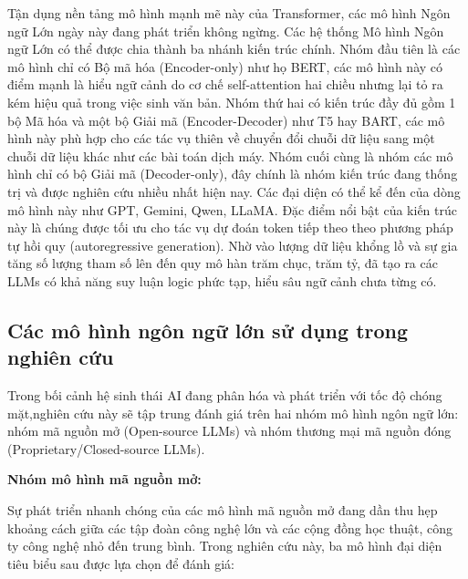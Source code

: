 Tận dụng nền tảng mô hình mạnh mẽ này của Transformer, các mô hình Ngôn ngữ Lớn ngày này đang phát triển không ngừng. Các hệ thống Mô hình Ngôn ngữ Lớn có thể được chia thành ba nhánh kiến trúc chính. Nhóm đầu tiên là các mô hình chỉ có Bộ mã hóa (Encoder-only) như họ BERT, các mô hình này có điểm mạnh là hiểu ngữ cảnh do cơ chế self-attention hai chiều nhưng lại tỏ ra kém hiệu quả trong việc sinh văn bản. Nhóm thứ hai có kiến trúc đầy đủ gồm 1 bộ Mã hóa và một bộ Giải mã (Encoder-Decoder) như T5 hay BART, các mô hình này phù hợp cho các tác vụ thiên về chuyển đổi chuỗi dữ liệu sang một chuỗi dữ liệu khác như các bài toán dịch máy. Nhóm cuối cùng là nhóm các mô hình chỉ có bộ Giải mã (Decoder-only), đây chính là nhóm kiến trúc đang thống trị và được nghiên cứu nhiều nhất hiện nay. Các đại diện có thể kể đến của dòng mô hình này như GPT, Gemini, Qwen, LLaMA. Đặc điểm nổi bật của kiến trúc này là chúng được tối ưu cho tác vụ dự đoán token tiếp theo theo phương pháp tự hồi quy (autoregressive generation). Nhờ vào lượng dữ liệu khổng lồ và sự gia tăng số lượng tham số lên đến quy mô hàn trăm chục, trăm tỷ, đã tạo ra các LLMs có khả năng suy luận logic phức tạp, hiểu sâu ngữ cảnh chưa từng có.


\subsection{Các mô hình ngôn ngữ lớn sử dụng trong nghiên cứu}

Trong bối cảnh hệ sinh thái AI đang phân hóa và phát triển với tốc độ chóng mặt,nghiên cứu này sẽ tập trung đánh giá trên hai nhóm mô hình ngôn ngữ lớn: nhóm mã nguồn mở (Open-source LLMs) và nhóm thương mại mã nguồn đóng (Proprietary/Closed-source LLMs).

\textbf{Nhóm mô hình mã nguồn mở:}

Sự phát triển nhanh chóng của các mô hình mã nguồn mở đang dần thu hẹp khoảng cách giữa các tập đoàn công nghệ lớn và các cộng đồng học thuật, công ty công nghệ nhỏ đến trung bình. Trong nghiên cứu này, ba mô hình đại diện tiêu biểu sau được lựa chọn để đánh giá:

